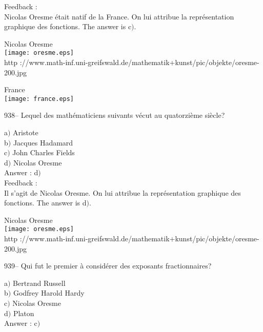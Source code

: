 ﻿\documentclass[letterpaper, 12pt]{article}
\begin{document}
Feedback : \\
Nicolas Oresme \'etait natif de la France. On lui attribue la
repr\'esentation graphique des fonctions. The answer is c$)$.\\

        \begin{center}
        Nicolas Oresme\\
    \texttt{[image: oresme.eps]}\\
        {\footnotesize http
://www.math-inf.uni-greifswald.de/mathematik+kunst/pic/objekte/oresme-200.jpg}
    \end{center}

        \begin{center}
        France\\
    \texttt{[image: france.eps]}\\
    \end{center}

938-- Lequel des math\'ematiciens suivants v\'ecut au quatorzi\`eme
si\`ecle?

a$)$ Aristote \\
b$)$ Jacques Hadamard \\
c$)$ John Charles Fields \\
d$)$ Nicolas Oresme\\

Answer : d$)$\\

Feedback :\\
Il s'agit de Nicolas Oresme. On lui attribue la repr\'esentation graphique
des fonctions. The answer is d$)$.\\

        \begin{center}
        Nicolas Oresme\\
    \texttt{[image: oresme.eps]}\\
        {\footnotesize http
://www.math-inf.uni-greifswald.de/mathematik+kunst/pic/objekte/oresme-200.jpg}
    \end{center}

939-- Qui fut le premier \`a consid\'erer des exposants
fractionnaires?

a$)$ Bertrand Russell \\
b$)$ Godfrey Harold Hardy \\
c$)$ Nicolas Oresme \\
d$)$ Platon\\

Answer : c$)$\\
\end{document}
